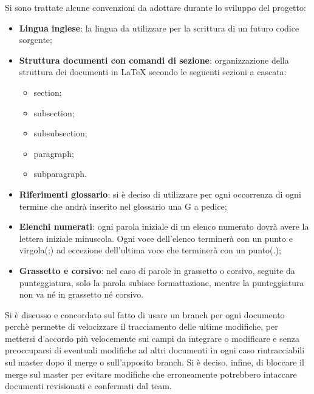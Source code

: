 Si sono trattate alcune convenzioni da adottare durante lo sviluppo del 
progetto:
\begin{itemize}
\item \textbf{Lingua inglese}: la lingua da utilizzare per la scrittura di un 
futuro codice sorgente;
\item \textbf{Struttura documenti con comandi di sezione}: organizzazione della 
struttura dei documenti in \LaTeX{} secondo le seguenti sezioni a cascata:
\begin{itemize}
	\item section;
	\item subsection;
	\item subsubsection;
	\item paragraph;
	\item subparagraph.
\end{itemize}
\item \textbf{Riferimenti glossario}: si è deciso di utilizzare per ogni 
occorrenza di ogni termine che andrà inserito nel glossario una G a pedice;
\item \textbf{Elenchi numerati}: ogni parola iniziale di un elenco numerato 
dovrà avere la lettera iniziale minuscola. Ogni voce dell'elenco terminerà con 
un punto e virgola(;) ad eccezione dell'ultima voce che terminerà con un 
punto(.);
\item \textbf{Grassetto e corsivo}: nel caso di parole in grassetto o corsivo, 
seguite da punteggiatura, solo la parola subisce formattazione, mentre la 
punteggiatura non va né in grassetto né corsivo.
\end{itemize}
Si è discusso e concordato sul fatto di usare un branch per ogni documento 
perchè permette di velocizzare il tracciamento delle ultime modifiche, per 
mettersi d'accordo più velocemente sui campi da integrare o modificare e senza 
preoccuparsi di eventuali modifiche ad altri documenti in ogni caso 
rintracciabili sul master dopo il merge o sull'apposito branch. Si è deciso, 
infine, di bloccare il merge sul master per evitare modifiche che erroneamente 
potrebbero intaccare documenti revisionati e confermati dal team.


\pagebreak
